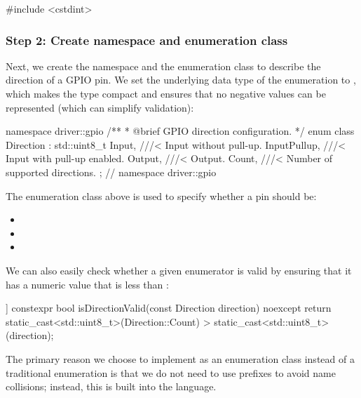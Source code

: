 \begin{cppcode}
#include <cstdint>
\end{cppcode}

\subsubsection{Step 2: Create namespace and enumeration class}
\label{c2:sec:enumclass}
Next, we create the namespace  and the enumeration class  to
describe the direction of a GPIO pin. We set the underlying data type of the enumeration to
, which makes the type compact and ensures that no negative values can be
represented (which can simplify validation):

\begin{cppcode}
namespace driver::gpio
{
/**
 * @brief GPIO direction configuration.
 */
enum class Direction : std::uint8_t
{
    Input,       ///< Input without pull-up.
    InputPullup, ///< Input with pull-up enabled.
    Output,      ///< Output.
    Count,       ///< Number of supported directions.
};
} // namespace driver::gpio
\end{cppcode}

\noindent The enumeration class above is used to specify whether a pin should be:
\begin{itemize}
  \item {}
  \item {}
  \item {}
\end{itemize}
We can also easily check whether a given enumerator  is valid by ensuring that it
has a numeric value that is less than :

\begin{cppcode}
[[nodiscard]] constexpr bool isDirectionValid(const Direction direction) noexcept
{
    return static_cast<std::uint8_t>(Direction::Count) > static_cast<std::uint8_t>(direction);
}
\end{cppcode}

\noindent The primary reason we choose to implement  as an enumeration class
instead of a traditional enumeration is that we do not need to use prefixes to avoid name
collisions; instead, this is built into the language.

